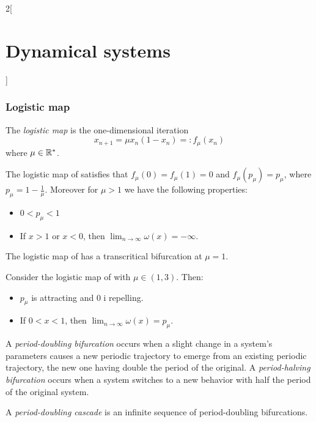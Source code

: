 \documentclass[../../../main_math.tex]{subfiles}
\begin{document}
\begin{multicols}{2}[\section{Dynamical systems}]
  \subsubsection{Logistic map}
  \begin{definition}
    The \emph{logistic map} is the one-dimensional iteration
    \begin{equation}\label{DS:logistic}
      x_{n+1}=\mu x_n(1-x_n)=:f_\mu(x_n)
    \end{equation}
    where $\mu\in\mathbb{R}^*$.
  \end{definition}
  \begin{proposition}
    The logistic map of  satisfies that $f_\mu(0)=f_\mu(1)=0$ and $f_\mu(p_\mu)=p_\mu$, where $p_\mu=1-\frac{1}{\mu}$. Moreover for $\mu > 1$ we have the following properties:
    \begin{itemize}
      \item $0<p_\mu<1$
      \item If $x>1$ or $x<0$, then $\displaystyle\lim_{n\to\infty} \omega(x)=-\infty$.
    \end{itemize}
  \end{proposition}
  \begin{proposition}
    The logistic map of  has a transcritical bifurcation at $\mu = 1$.
  \end{proposition}
  \begin{proposition}
    Consider the logistic map of  with $\mu\in(1,3)$. Then:
    \begin{itemize}
      \item $p_\mu$ is attracting and 0 i repelling.
      \item If $0<x<1$, then $\displaystyle\lim_{n\to\infty} \omega(x)=p_\mu$.
    \end{itemize}
  \end{proposition}
  \begin{definition}
    A \emph{period-doubling bifurcation} occurs when a slight change in a system's parameters causes a new periodic trajectory to emerge from an existing periodic trajectory, the new one having double the period of the original. A \emph{period-halving bifurcation} occurs when a system switches to a new behavior with half the period of the original system.
  \end{definition}
  \begin{definition}
    A \emph{period-doubling cascade} is an infinite sequence of period-doubling bifurcations.

\end{definition}
\end{multicols}
\end{document}
